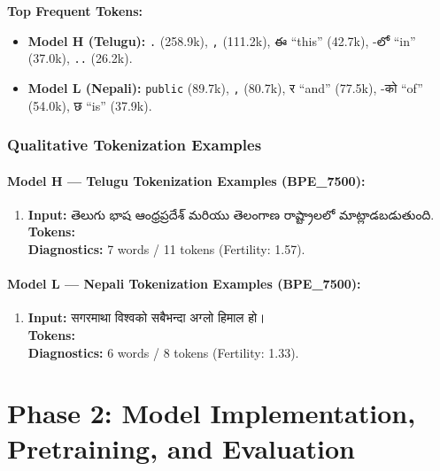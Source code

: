 \documentclass[8pt]{article}
\newcommand{\telugu}[1]{{\telugufont #1}}
\newcommand{\nepali}[1]{{\nepalifont #1}}
\begin{document}
\textbf{Top Frequent Tokens:}
\begin{itemize}
    \item \textbf{Model H (Telugu):} \texttt{.} (258.9k), \texttt{,} (111.2k), \telugu{ఈ} ``this'' (42.7k), \telugu{-లో} ``in'' (37.0k), \texttt{..} (26.2k).
    \item \textbf{Model L (Nepali):} \texttt{public} (89.7k), \texttt{,} (80.7k), \nepali{र} ``and'' (77.5k), \nepali{-को} ``of'' (54.0k), \nepali{छ} ``is'' (37.9k).
\end{itemize}


\subsubsection{Qualitative Tokenization Examples}

\paragraph{Model H — Telugu Tokenization Examples (BPE\_7500):}
{\small
\begin{enumerate}
   
    \item \textbf{Input:} \telugu{తెలుగు భాష ఆంధ్రప్రదేశ్ మరియు తెలంగాణ రాష్ట్రాలలో మాట్లాడబడుతుంది.} \\
    \textbf{Tokens:} {\telugufont ['తెలుగు', 'భాష', 'ఆంధ్ర', 'ప్రదేశ్', 'మరియు', 'తెలంగాణ', 'రాష్ట్ర', 'ాలలో', 'మాట్లాడ', 'బడుతుంది', '.']} \\
    \textbf{Diagnostics:} 7 words / 11 tokens (Fertility: 1.57).  

\end{enumerate}
}

\paragraph{Model L — Nepali Tokenization Examples (BPE\_7500):}
{\small
\begin{enumerate}
  
    \item \textbf{Input:} \nepali{सगरमाथा विश्वको सबैभन्दा अग्लो हिमाल हो।} \\
    \textbf{Tokens:} {\nepalifont ['सगरमाथा', 'विश्वको', 'सबैभन्दा', 'अग्', 'लो', 'हिमाल', 'हो', '।']} \\
    \textbf{Diagnostics:} 6 words / 8 tokens (Fertility: 1.33).

   
\end{enumerate}
}


\section{Phase 2: Model Implementation, Pretraining, and Evaluation}
\label{sec:phase2}
\end{document}
